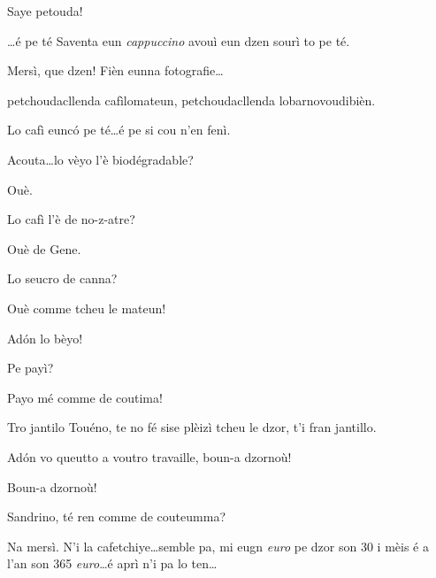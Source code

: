 \begin{drama}
\Spritzspeaks Saye petouda!

\Baristaspeaks{} \ldots é pe té Saventa eun \textit{cappuccino} avouì eun dzen sourì to pe té.

\Saventaspeaks Mersì, que dzen! Fièn eunna fotografie\ldots



\Saventaspeaks{} petchoudacllenda cafìlomateun, petchoudacllenda lobarnovoudibièn.

\Baristaspeaks{} Lo cafì eunc\'o pe té\ldots é pe si cou n'en fenì.

\Richardspeaks Acouta\ldots lo vèyo l'è biodégradable?

\Baristaspeaks Ouè.

\Richardspeaks Lo cafì l'è de no-z-atre?

\Baristaspeaks Ouè de Gene.

\Richardspeaks Lo seucro de canna?

\Baristaspeaks Ouè comme tcheu le mateun!

\Richardspeaks Ad\'on lo bèyo!

\Baristaspeaks{} Pe payì?

\Tuenospeaks Payo mé comme de coutima!


\Gerominespeaks Tro jantilo Touéno, te no fé sise plèizì tcheu le dzor, t'i fran jantillo.

\Baristaspeaks Ad\'on vo queutto a voutro travaille, boun-a dzornoù!

\Tcheuttespeaks Boun-a dzornoù!


\Baristaspeaks Sandrino, té ren comme de couteumma?

\Sandrinospeaks Na mersì. N’i la cafetchiye\ldots semble pa, mi eugn \textit{euro} pe dzor son 30 i mèis é a l’an son 365 \textit{euro}\ldots é aprì n'i pa lo ten\ldots




\end{drama}
